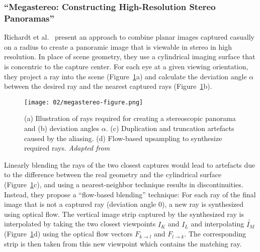 \subsubsection{``Megastereo: Constructing High-Resolution Stereo Panoramas'' \cite{megastereo} \label{subsec:megastereo}}
Richardt et al.\ \cite{megastereo} present an approach to combine planar images captured casually on a radius to create a panoramic image that is viewable in stereo in high resolution. In place of scene geometry, they use a cylindrical imaging surface that is concentric to the capture center. For each eye at a given viewing orientation, they project a ray into the scene (Figure~\ref{fig:megastereo}a) and calculate the deviation angle $\alpha$ between the desired ray and the nearest captured rays (Figure~\ref{fig:megastereo}b). 

\begin{figure}[]
\centering
\texttt{[image: 02/megastereo-figure.png]}
\caption[Flow-based blending in Megastereo \cite{megastereo}]{(a) Illustration of rays required for creating a stereoscopic panorama and (b) deviation angles $\alpha$. (c) Duplication and truncation artefacts caused by the aliasing. (d) Flow-based upsampling to synthesize required rays. \emph{Adapted from \cite{megastereo}}}
\label{fig:megastereo}
\end{figure}

Linearly blending the rays of the two closest captures would lead to artefacts due to the difference between the real geometry and the cylindrical surface (Figure~\ref{fig:megastereo}c), and using a nearest-neighbor technique results in discontinuities. Instead, they propose a ``flow-based blending'' technique: For each ray of the final image that is not a captured ray (deviation angle 0), a new ray is synthesized using optical flow. The vertical image strip captured by the synthesized ray is interpolated by taking the two closest viewpoints $I_K$ and $I_L$ and interpolating $\widetilde{I_M}$ (Figure~\ref{fig:megastereo}d) using the optical flow vectors $F_{k\rightarrow l}$ and $F_{l\rightarrow k}$.  The corresponding strip is then taken from this new viewpoint which contains the matching ray.


